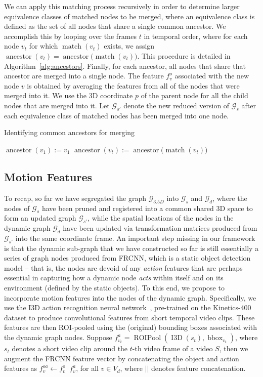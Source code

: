 \documentclass[letterpaper]{article} \usepackage{aaai22}  \usepackage{times}  \usepackage{helvet}  \usepackage{courier}  \usepackage[hyphens]{url}  \usepackage{graphicx} \urlstyle{rm} \def\UrlFont{\rm}  \usepackage{natbib}  \usepackage{caption} \DeclareCaptionStyle{ruled}{labelfont=normalfont,labelsep=colon,strut=off} \frenchspacing  \setlength{\pdfpagewidth}{8.5in}  \setlength{\pdfpageheight}{11in}  \usepackage{algorithm}
\newcommand{\V}{{S}}
\newcommand{\vidclip}{{s}}
\newcommand{\f}{f}
\newcommand{\fo}{f^o}
\newcommand{\fa}{f^a}
\newcommand{\graph}{\mathcal{G}}
\newcommand{\gtf}{\graph_{3.5D}}
\DeclareMathOperator*{\concat}{||}
\newcommand{\nodes}{V}
\newcommand{\node}{v}
\DeclareMathOperator{\bbox}{bbox}
\DeclareMathOperator{\roipool}{ROIPool}
\DeclareMathOperator{\itd}{I3D}
\DeclareMathOperator{\match}{match}
\DeclareMathOperator{\ancestor}{ancestor}
\begin{document}
We can apply this matching process recursively in order to determine larger equivalence classes of matched nodes to be merged, where an equivalence class is defined as the set of all nodes that share a single common ancestor. We accomplish this by looping over the frames $t$ in temporal order, where for each node $\node_t$ for which $\match(\node_t)$ exists, we assign 
$\ancestor(\node_t) = \ancestor\big(\match(\node_t)\big)$. This procedure is detailed in Algorithm~\ref{alg:ancestors}. Finally, for each ancestor, all nodes that share that ancestor are merged into a single node. The feature $\fo_\node$ associated with the new node $\node$ is obtained by averaging the features from all of the nodes that were merged into it. We use the 3D coordinate $p$ of the parent node for all the child nodes that are merged into it. Let $\graph_{s'}$ denote the new reduced version of $\graph_s$ after each equivalence class of matched nodes has been merged into one node.

\begin{algorithm}[tb]
\caption{Identifying common ancestors for merging}
\label{alg:ancestors}
\begin{algorithmic}\FOR{$\node_1 \in \nodes^s_1$}
\STATE $\ancestor(\node_1) := \node_1$
\ENDFOR
{}
\FOR{$\node_t \in \nodes^s_t$}
\IF{$\match(\node_t)$ exists}
\STATE $\ancestor(\node_t) := \ancestor\bigl(\match(\node_t)\bigr)$
\ENDIF
\ENDFOR
\ENDFOR
\end{algorithmic}
\end{algorithm}
\subsection{Motion Features}
To recap, so far we have segregated the graph $\gtf$ into $\graph_s$ and $\graph_d$, where the nodes of $\graph_s$ have been pruned and registered into a common shared 3D space to form an updated graph $\graph_{s'}$, while the spatial locations of the nodes in the dynamic graph $\graph_d$ have been updated via transformation matrices produced from $\graph_{s'}$ into the same coordinate frame. An important step missing in our framework is that the dynamic sub-graph that we have constructed so far is still essentially a series of graph nodes produced from FRCNN, which is a static object detection model -- that is, the nodes are devoid of any \emph{action} features that are perhaps essential in capturing how a dynamic node \emph{acts} within itself and on its environment (defined by the static objects). To this end, we propose to incorporate motion features into the nodes of the dynamic graph. Specifically, we use the I3D action recognition neural network~\cite{carreira2017quo}, pre-trained on the Kinetics-400 dataset to produce convolutional features from short temporal video clips. These features are then ROI-pooled using the (original) bounding boxes associated with the dynamic graph nodes. Suppose $\fa_{\node_t}=\roipool(\itd(\vidclip_t), \bbox_{\node_t})$, where $\vidclip_t$ denotes a short video clip around the $t$-th video frame of a video $\V$, then we augment the FRCNN feature vector by concatenating the object and action features as $\f^{oa}_\node \leftarrow \fo_\node \concat \fa_\node$, for all $\node\in\nodes_d$, where $||$ denotes feature concatenation.
\end{document}
